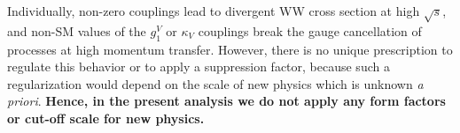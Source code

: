 Individually, non-zero couplings lead to divergent WW cross 
section at high $\sqrt{s}$, and non-SM values of the $g_1^V$ or $\kappa_V$ 
couplings break the gauge cancellation of processes at high momentum transfer.  
However, there is no unique prescription to regulate this behavior or  
to apply a suppression factor, because such a regularization 
would depend on the scale of new physics which is unknown \textit{a priori}. 
{ \bf Hence, in the present analysis we do not apply any 
form factors or cut-off scale for new physics.}


